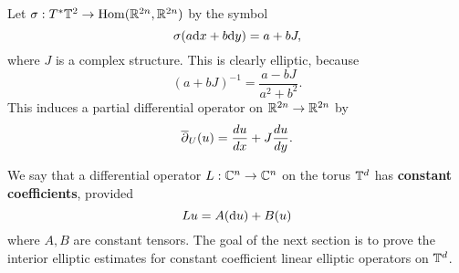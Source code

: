   \begin{example}
    Let $\sigma:T^{*}\mathbb{T}^{2}\to \operatorname{\mathrm{Hom}}(\mathbb{R}^{2n},\mathbb{R}^{2n})$ by the symbol
    \begin{equation*}
      \sigma(a\mathrm{d} x+b\mathrm{d} y)=a+bJ,
    \end{equation*}
    where $J$ is a complex structure. This is clearly elliptic, because
    \begin{equation*}
      (a+bJ)^{-1}=\frac{a-bJ}{a^{2}+b^{2}}.
    \end{equation*}
    This induces a partial differential operator on $\mathbb{R}^{2n}\to \mathbb{R}^{2n}$ by
    \begin{equation*}
      \overline{\partial}_{U}(u)=\frac{du}{dx}+J\frac{du}{dy}.
    \end{equation*}
  \end{example}
  \begin{defn}
    We say that a differential operator $L:\mathbb{C}^{n}\to \mathbb{C}^{n}$ on the torus $\mathbb{T}^{d}$ has \textbf{constant coefficients}, provided
    \begin{equation*}
      Lu=A(\mathrm{d} u)+B(u)
    \end{equation*}
    where $A,B$ are constant tensors. The goal of the next section is to prove the interior elliptic estimates for constant coefficient linear elliptic operators on $\mathbb{T}^{d}$.
  \end{defn}
  \clearpage

